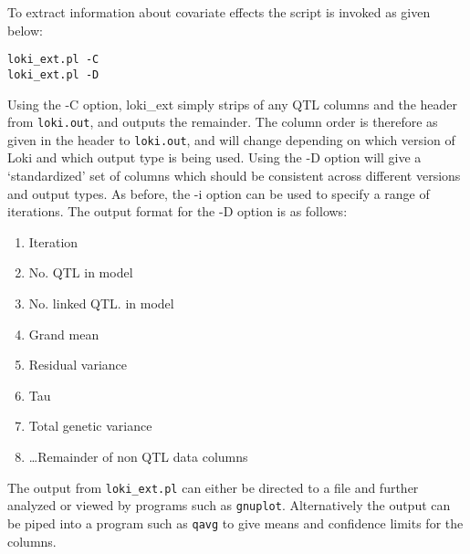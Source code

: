 \documentclass[10pt,a4paper]{article}
\begin{document}
To extract information about covariate effects the script is invoked as given below:
\begin{verbatim}
loki_ext.pl -C
loki_ext.pl -D
\end{verbatim}
Using the -C option, loki\_ext simply strips of any QTL columns and the
header from \verb+loki.out+, and outputs the remainder.  The column order is
therefore as given in the header to \verb+loki.out+, and will change
depending on which version of Loki and which output type is being used.
Using the -D option will give a `standardized' set of columns which should
be consistent across different versions and output types.  As before, the
-i option can be used to specify a range of iterations.  The output format
for the -D option is as follows:
\begin{enumerate}
  \item Iteration
  \item No. QTL in model
  \item No. linked QTL. in model
  \item Grand mean
  \item Residual variance
  \item Tau
  \item Total genetic variance
  \item{\ldots}Remainder of non QTL data columns
\end{enumerate}
The output from \verb+loki_ext.pl+ can either be directed to a file and further
analyzed or viewed by programs such as \verb+gnuplot+.  Alternatively the output
can be piped into a program such as \verb+qavg+ to give means and confidence
limits for the columns.
\end{document}

